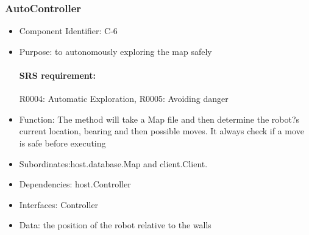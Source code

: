 \documentclass[11pt, a4paper]{report}
\begin{document}
\subsubsection{AutoController}
\begin{itemize}
\item Component Identifier: C-6
\item Purpose: to autonomously exploring the map safely
\paragraph{SRS requirement:} R0004: Automatic Exploration, R0005: Avoiding danger
\item Function: The method will take a Map file and then determine the robot?s current location, bearing and then possible moves.
It always check if a move is safe before  executing
\item Subordinates:host.database.Map and client.Client.
\item Dependencies: host.Controller
\item Interfaces: Controller
\item Data: the position of the robot relative to the walls
\end{itemize}
\end{document}
